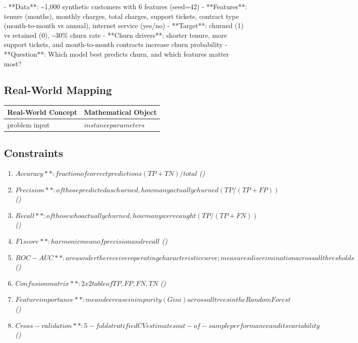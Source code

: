 \documentclass[11pt, a4paper]{article}
\begin{document}
- **Data**: \textasciitilde{}1,000 synthetic customers with 6 features (seed=42)
- **Features**: tenure (months), monthly charges, total charges, support tickets, contract type (month-to-month vs annual), internet service (yes/no)
- **Target**: churned (1) vs retained (0), \textasciitilde{}30\% churn rate
- **Churn drivers**: shorter tenure, more support tickets, and month-to-month contracts increase churn probability
- **Question**: Which model best predicts churn, and which features matter most?

\subsection{Real-World Mapping}

\begin{longtable}{ll}
\toprule
\textbf{Real-World Concept} & \textbf{Mathematical Object} \\
\midrule
\endhead
problem input & $instance parameters$ \\
\bottomrule
\end{longtable}

\subsection{Constraints}

\begin{enumerate}
  \item $Accuracy**: fraction of correct predictions (TP + TN) / total$
  \hfill \textit{()}
  \item $Precision**: of those predicted as churned, how many actually churned (TP / (TP + FP))$
  \hfill \textit{()}
  \item $Recall**: of those who actually churned, how many were caught (TP / (TP + FN))$
  \hfill \textit{()}
  \item $F1 score**: harmonic mean of precision and recall$
  \hfill \textit{()}
  \item $ROC-AUC**: area under the receiver operating characteristic curve; measures discrimination across all thresholds$
  \hfill \textit{()}
  \item $Confusion matrix**: 2x2 table of TP, FP, FN, TN$
  \hfill \textit{()}
  \item $Feature importance**: mean decrease in impurity (Gini) across all trees in the Random Forest$
  \hfill \textit{()}
  \item $Cross-validation**: 5-fold stratified CV estimates out-of-sample performance and its variability$
  \hfill \textit{()}
\end{enumerate}
\end{document}
